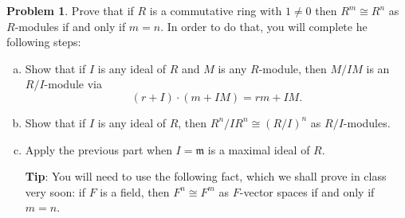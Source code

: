 \documentclass[11pt]{article}
\newcommand{\m}{\mathfrak{m}}
\theoremstyle{definition}
\newtheorem{problem}{Problem}
\begin{document}
\begin{problem}
Prove that if $R$ is a commutative ring with $1\neq 0$ then $R^m \cong R^n$ as $R$-modules if and only if $m = n$. In order to do that, you will complete he following steps:

\begin{enumerate}[a)]

\item Show that if $I$ is any ideal of $R$ and $M$ is any $R$-module, then $M/IM$ is an $R/I$-module via 
$$(r + I) \cdot (m + IM) = rm + IM.$$
 
\item Show that if $I$ is any ideal of $R$, then $R^n/IR^n \cong (R/I)^n$ as $R/I$-modules.

\item Apply the previous part when $I = \m$ is a maximal ideal of $R$. 

{\bf Tip}: You will need to use the following fact, which we shall prove in class very soon: if $F$ is a field, then $F^n\cong F^m$ as $F$-vector spaces if and only if $m=n$.
\end{enumerate}
\end{problem}
\end{document}
